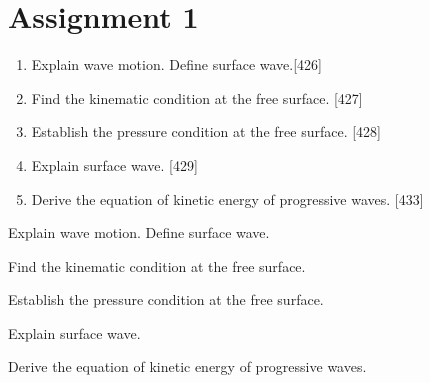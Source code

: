 \documentclass[12pt]{article}
\begin{document}
\section{Assignment 1}
\begin{enumerate}
    \item Explain wave motion. Define surface wave.[426]
    \item Find the kinematic condition at the free surface. [427]
    \item Establish the pressure condition at the free surface. [428] 
    \item Explain surface wave. [429]
    \item Derive the equation of kinetic energy of progressive waves. [433]
\end{enumerate}
\newpage
\begin{prob}
    Explain wave motion. Define surface wave.
\end{prob}
\begin{soln}
    
\end{soln}
\newpage
\begin{prob}
    Find the kinematic condition at the free surface.
\end{prob}
\begin{soln}
    
\end{soln}
\newpage
\begin{prob}
    Establish the pressure condition at the free surface.
\end{prob}
\begin{soln}
    
\end{soln}
\newpage
\begin{prob}
    Explain surface wave.
\end{prob}
\begin{soln}
    
\end{soln}
\newpage
\begin{prob}
    Derive the equation of kinetic energy of progressive waves.
\end{prob}
\begin{soln}
    
\end{soln}
\end{document}
